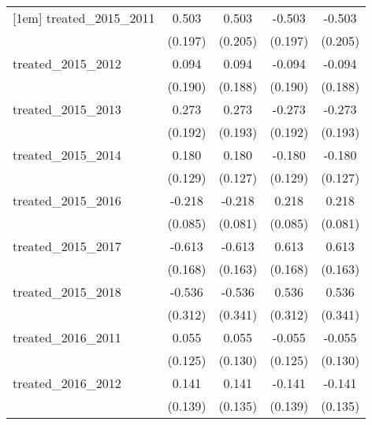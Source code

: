 {\begin{tabular}{l*{4}{c}}
[1em]
treated\_2015\_2011&       0.503\sym{*}  &       0.503\sym{*}  &      -0.503\sym{*}  &      -0.503\sym{*}  \\
            &     (0.197)         &     (0.205)         &     (0.197)         &     (0.205)         \\
[1em]
treated\_2015\_2012&       0.094         &       0.094         &      -0.094         &      -0.094         \\
            &     (0.190)         &     (0.188)         &     (0.190)         &     (0.188)         \\
[1em]
treated\_2015\_2013&       0.273         &       0.273         &      -0.273         &      -0.273         \\
            &     (0.192)         &     (0.193)         &     (0.192)         &     (0.193)         \\
[1em]
treated\_2015\_2014&       0.180         &       0.180         &      -0.180         &      -0.180         \\
            &     (0.129)         &     (0.127)         &     (0.129)         &     (0.127)         \\
[1em]
treated\_2015\_2016&      -0.218\sym{*}  &      -0.218\sym{**} &       0.218\sym{*}  &       0.218\sym{**} \\
            &     (0.085)         &     (0.081)         &     (0.085)         &     (0.081)         \\
[1em]
treated\_2015\_2017&      -0.613\sym{***}&      -0.613\sym{***}&       0.613\sym{***}&       0.613\sym{***}\\
            &     (0.168)         &     (0.163)         &     (0.168)         &     (0.163)         \\
[1em]
treated\_2015\_2018&      -0.536         &      -0.536         &       0.536         &       0.536         \\
            &     (0.312)         &     (0.341)         &     (0.312)         &     (0.341)         \\
[1em]
treated\_2016\_2011&       0.055         &       0.055         &      -0.055         &      -0.055         \\
            &     (0.125)         &     (0.130)         &     (0.125)         &     (0.130)         \\
[1em]
treated\_2016\_2012&       0.141         &       0.141         &      -0.141         &      -0.141         \\
            &     (0.139)         &     (0.135)         &     (0.139)         &     (0.135)         \\

\end{tabular}}
